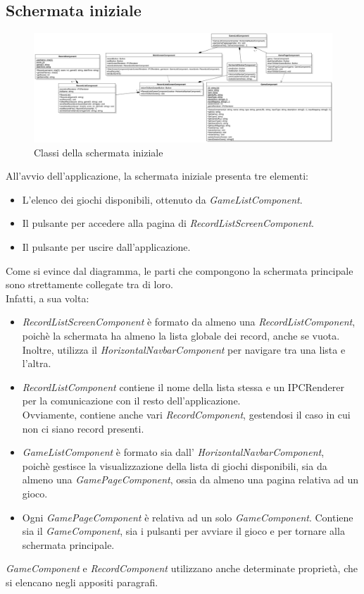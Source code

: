 \subsection{Schermata iniziale}
\begin{figure}[h]
    \centering
    \includegraphics[width=340pt]{ProgettazioneTecnica/MainScreen.png}
    \caption{Classi della schermata iniziale}
    \label{fig:schermataIniziale}
\end{figure}
All'avvio dell'applicazione, la schermata iniziale presenta tre elementi:
\begin{itemize}
    \item L'elenco dei giochi disponibili, ottenuto da \emph{GameListComponent}.
    \item Il pulsante per accedere alla pagina di \emph{RecordListScreenComponent}.
    \item Il pulsante per uscire dall'applicazione.
\end{itemize}
Come si evince dal diagramma, le parti che compongono la schermata principale sono strettamente collegate tra di loro.\\
Infatti, a sua volta:
\begin{itemize}
    \item \emph{RecordListScreenComponent} è formato da almeno una \emph{RecordListComponent}, poichè la schermata ha almeno la lista globale dei record, anche se vuota. Inoltre, utilizza il \emph{HorizontalNavbarComponent} per navigare tra una lista e l'altra.
    \item \emph{RecordListComponent} contiene il nome della lista stessa e un IPCRenderer per la comunicazione con il resto dell'applicazione.\\ Ovviamente, contiene anche vari \emph{RecordComponent}, gestendosi il caso in cui non ci siano record presenti.
    \item \emph{GameListComponent} è formato sia dall' \emph{HorizontalNavbarComponent},\\ poichè gestisce la visualizzazione della lista di giochi disponibili, sia da almeno una \emph{GamePageComponent}, ossia da almeno una pagina relativa ad un gioco.
    \item Ogni \emph{GamePageComponent} è relativa ad un solo \emph{GameComponent}. Contiene sia il \emph{GameComponent}, sia i pulsanti per avviare il gioco e per tornare alla schermata principale.
\end{itemize}
\emph{GameComponent} e \emph{RecordComponent} utilizzano anche determinate proprietà, che si elencano negli appositi paragrafi.
